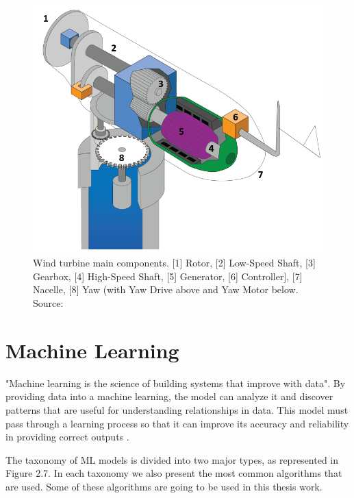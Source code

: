 \begin{figure}[htbp]
	\centering
	\includegraphics[scale=0.5]{Chapters/Figures/background_fig8.PNG}
	\caption{Wind turbine main components. [1] Rotor, [2] Low-Speed Shaft, [3] Gearbox, [4] High-Speed Shaft, [5] Generator, [6] Controller], [7] Nacelle, [8] Yaw (with Yaw Drive above and Yaw Motor below. Source: \cite{OLD_29_WIND} }
	\label{fig:Figuras_Tree_silhouettes-vectorial}
\end{figure}


\section{Machine Learning} 
\label{sub:if_you_use_this_template} 

"Machine learning is the science of building systems that improve with data"\cite{FCT_AA}. By providing data into a machine learning, the model can analyze it and discover patterns that are useful for understanding relationships in data. This model must pass through a learning process so that it can improve its accuracy and reliability in providing correct outputs \cite{OLD_15_WIND} \cite{46_ML}.

The taxonomy of ML models is divided into two major types, as represented in Figure 2.7. In each taxonomy we also present the most common algorithms that are used. Some of these algorithms are going to be used in this thesis work.

